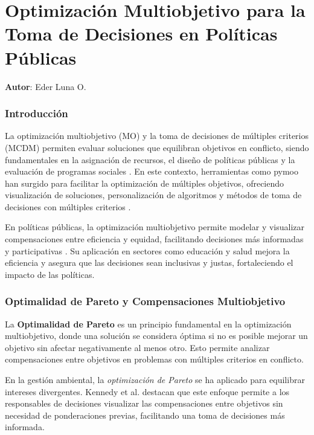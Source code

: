 \documentclass[12pt]{article}
\begin{document}
	
    \chapter{Optimización Multiobjetivo para la Toma de Decisiones en Políticas Públicas}
    \textbf{Autor}: \large{Eder Luna O.}
    \label{chap:11}
	
	\subsection*{Introducción}
	
	La optimización multiobjetivo (MO) y la toma de decisiones de múltiples criterios (MCDM) permiten evaluar soluciones que equilibran objetivos en conflicto, siendo fundamentales en la asignación de recursos, el diseño de políticas públicas y la evaluación de programas sociales \cite{Sengupta2016}. En este contexto, herramientas como pymoo han surgido para facilitar la optimización de múltiples objetivos, ofreciendo visualización de soluciones, personalización de algoritmos y métodos de toma de decisiones con múltiples criterios \cite{Blank2020}.  
	
	En políticas públicas, la optimización multiobjetivo permite modelar y visualizar compensaciones entre eficiencia y equidad, facilitando decisiones más informadas y participativas \cite{Papalexopoulos2022}. Su aplicación en sectores como educación y salud mejora la eficiencia y asegura que las decisiones sean inclusivas y justas, fortaleciendo el impacto de las políticas.
	
	\subsection{Optimalidad de Pareto y Compensaciones Multiobjetivo}
	
	La \textbf{Optimalidad de Pareto} es un principio fundamental en la optimización multiobjetivo, donde una solución se considera óptima si no es posible mejorar un objetivo sin afectar negativamente al menos otro. Esto permite analizar compensaciones entre objetivos en problemas con múltiples criterios en conflicto.  
	
	En la gestión ambiental, la \textit{optimización de Pareto} se ha aplicado para equilibrar intereses divergentes. Kennedy et al. \cite{Kennedy2008} destacan que este enfoque permite a los responsables de decisiones visualizar las compensaciones entre objetivos sin necesidad de ponderaciones previas, facilitando una toma de decisiones más informada.  
	
\end{document}
